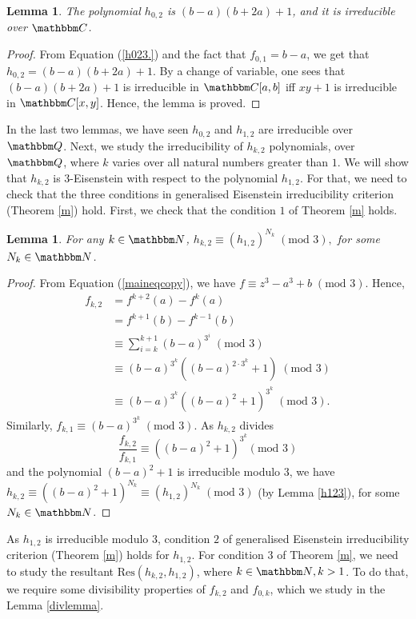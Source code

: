 \documentclass[reqno]{amsart}
\renewcommand{\eqref}[1]{(\ref{#1})}
\numberwithin{equation}{section}
\theoremstyle{plain}
\newtheorem{lemma}[theorem]{Lemma}
\theoremstyle{definition}
\theoremstyle{definition}
\newcommand{\Q}{{\mathbbm Q}}
\newcommand{\C}{{\mathbbm C}}
\newcommand{\N}{{\mathbbm N}}
\begin{document}
    \begin{lemma}\label{h023}
        The polynomial $h_{0,2}$ is $(b-a)(b+2a)+1$, and it is irreducible over $\C$.
    \end{lemma}
    \begin{proof}
        From Equation \eqref{h023.} and the fact that $f_{0,1}=b-a$, we get that $h_{0,2} = (b-a)(b+2a)+1$. By a change of variable, one sees that $(b-a)(b+2a) +1$ is irreducible in $\C[a,b]$ iff $xy+1$ is irreducible in $\C[x,y]$. Hence, the lemma is proved.  
    \end{proof}
    In the last two lemmas, we have seen $h_{0,2}$ and $h_{1,2}$ are irreducible over $\Q$. Next, we study the irreducibility of $h_{k,2}$ polynomials, over $\Q$, where $k$ varies over all natural numbers greater than $1$. We will show that $h_{k,2}$ is $3$-Eisenstein with respect to the polynomial $h_{1,2}$. For that, we need to check that the three conditions in generalised Eisenstein irreducibility criterion (Theorem \ref{m}) hold. First, we check that the condition $1$ of Theorem \ref{m} holds.
    \begin{lemma}\label{k23E1}
        For any $k\in \N$, $h_{k,2}\equiv (h_{1,2})^{N_{k}}\;(\text{mod }3),$ for some $N_{k}\in \N$.
    \end{lemma}
    \begin{proof}
        From Equation \eqref{maineqcopy}, we have $f \equiv z^{3} - a^{3} +b\;(\text{mod }3)$. Hence, 
        \begin{align*}
             f_{k,2} & = f^{k+2} (a) - f^{k}(a)\\
             & = f^{k+1}(b) - f^{k-1}(b)\\
             & \equiv \sum_{i=k}^{k+1}(b-a)^{3^{i}}\; (\text{mod }3)\\
             & \equiv (b-a)^{3^{k}}\left((b-a)^{2\cdot 3^{k}}+1\right)\; (\text{mod }3)\\
             & \equiv (b-a)^{3^{k}}\left((b-a)^{2}+1\right)^{3^{k}}\;(\text{mod }3).
        \end{align*}
        Similarly, $f_{k,1}\equiv (b-a)^{3^{k}}\;(\text{mod }3)$. As $h_{k,2}$ divides $$\frac{f_{k,2}}{f_{k,1}}\equiv  \left((b-a)^{2}+1 \right)^{3^{k}} (\text{mod }3)$$ and the polynomial $(b-a)^{2}+1$ is irreducible modulo $3$, we have $h_{k,2}\equiv ((b-a)^{2}+1)^{N_{k}}\equiv (h_{1,2})^{N_{k}}\;(\text{mod }3)$ (by Lemma \ref{h123}), for some $N_{k}\in \N$. 
    \end{proof}
    As $h_{1,2}$ is irreducible modulo $3$, condition $2$ of generalised Eisenstein irreducibility criterion (Theorem \ref{m}) holds for $h_{1,2}$. For condition $3$ of Theorem \ref{m}, we need to study the resultant $\mbox{Res}(h_{k,2},h_{1,2})$, where $k\in \N, k>1$. To do that, we require some divisibility properties of $f_{k,2}$ and $f_{0,k}$, which we study in the Lemma \ref{divlemma}. 
\end{document}
